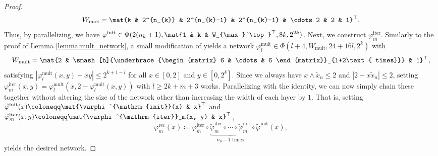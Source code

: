 \documentclass[a4paper, 11pt, headings = small, abstract]{scrartcl}
\begin{document}
\begin{proof}
    \[
        W_{\max}
        =\mat{k & 2^{n_{k}} & 2^{n_{k}-1} & 2^{n_{k}-1} & \cdots 2 & 2 & 1}^\top.
    \]
    Thus, by parallelizing, we have $\varphi^{\mathrm{init}}\in\Phi(2(n_{k}+1), \mat{1 & k & W_{\max}^\top}^\top, 8k, 2^{2k})$.
    Next, we construct $\varphi^{\mathrm{iter}}_m$.
    Similarly to the proof of Lemma \ref{lemma:mult_network}, a small modification of \cite[Lemma A.2]{schmidthieber20} yields a network $\varphi^{\mathrm{mult}}_l\in\Phi(l+4, W_{\mathrm{mult}}, 24+16l, 2^{k})$ with
    \begin{gather*}
        W_\mathrm{mult}
        =\mat{2 & \smash[b]{\underbrace{\begin{matrix}
            6 & \cdots & 6
        \end{matrix}}_{l+2\text{ times}}} & 1}^\top, \\
    \end{gather*}
    satisfying $|\varphi^\mathrm{mult}_l(x, y)-xy|\le2^{k+1-l}$ for all $x\in[0, 2]$ and $y\in[0, 2^{k}]$.
    Since we always have $x\wedge \widetilde{x}_n\le 2$ and $|2-x\widetilde{x}_n|\le 2$, setting $\varphi^{\mathrm{iter}}_m(x, y)=\varphi^{\mathrm{mult}}_l(x, 2-\varphi^{\mathrm{mult}}_l(x, y))$ with $l\ge 2k+m+3$ works.
    Parallelizing with the identity, we can now simply chain these together without altering the size of the network other than increasing the width of each layer by $1$.
    That is, setting $\widetilde{\varphi}^{\mathrm{init}}(x)\coloneqq\mat{\varphi^{\mathrm{init}}(x) & x}^\top$ and $\widetilde{\varphi}^{\mathrm{iter}}_m(x, y)\coloneqq\mat{\varphi^{\mathrm{iter}}_m(x, y) & x}^\top$,
    \[
        \varphi_m^{\mathrm{rec}}(x)
        \coloneqq\varphi^{\mathrm{iter}}_m\circ\underbrace{\widetilde{\varphi}^{\mathrm{iter}}_m\circ\cdots\circ\widetilde{\varphi}^{\mathrm{iter}}_m}_{n_0-1\text{ times}}\circ\widetilde{\varphi}^{\mathrm{init}}(x),
    \] 
    yields the desired network.
\end{proof}
\end{document}
